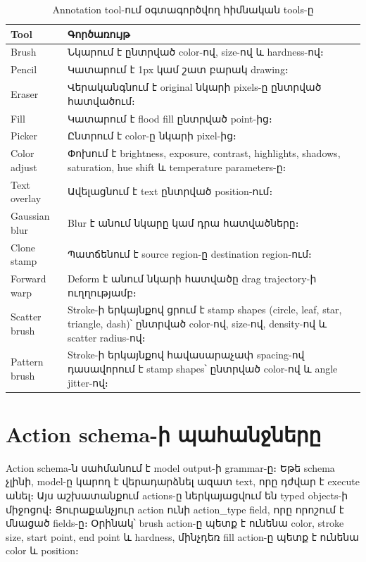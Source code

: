 \documentclass[12pt,a4paper]{report}
\newcommand{\Eng}[1]{\textenglish{#1}}
\begin{document}
\begin{table}[H]
\caption{Annotation tool-ում օգտագործվող հիմնական tools-ը}
\centering
\begin{tabularx}{\textwidth}{p{3.5cm}X}
\toprule
\textbf{Tool} & \textbf{Գործառույթ} \\
\midrule
\Eng{Brush} & Նկարում է ընտրված color-ով, size-ով և hardness-ով։ \\
\Eng{Pencil} & Կատարում է 1px կամ շատ բարակ drawing։ \\
\Eng{Eraser} & Վերականգնում է original նկարի pixels-ը ընտրված հատվածում։ \\
\Eng{Fill} & Կատարում է flood fill ընտրված point-ից։ \\
\Eng{Picker} & Ընտրում է color-ը նկարի pixel-ից։ \\
\Eng{Color adjust} & Փոխում է brightness, exposure, contrast, highlights, shadows, saturation, hue shift և temperature parameters-ը։ \\
\Eng{Text overlay} & Ավելացնում է text ընտրված position-ում։ \\
\Eng{Gaussian blur} & Blur է անում նկարը կամ դրա հատվածները։ \\
\Eng{Clone stamp} & Պատճենում է source region-ը destination region-ում։ \\
\Eng{Forward warp} & Deform է անում նկարի հատվածը drag trajectory-ի ուղղությամբ։ \\
\Eng{Scatter brush} & Stroke-ի երկայնքով ցրում է stamp shapes (circle, leaf, star, triangle, dash)՝ ընտրված color-ով, size-ով, density-ով և scatter radius-ով։ \\
\Eng{Pattern brush} & Stroke-ի երկայնքով հավասարաչափ spacing-ով դասավորում է stamp shapes՝ ընտրված color-ով և angle jitter-ով։ \\
\bottomrule
\end{tabularx}
\end{table}

\section{Action schema-ի պահանջները}

Action schema-ն սահմանում է model output-ի grammar-ը։ Եթե schema չլինի, model-ը կարող է վերադարձնել ազատ text, որը դժվար է execute անել։ Այս աշխատանքում actions-ը ներկայացվում են typed objects-ի միջոցով։ Յուրաքանչյուր action ունի \Eng{action\_type} field, որը որոշում է մնացած fields-ը։ Օրինակ՝ brush action-ը պետք է ունենա color, stroke size, start point, end point և hardness, մինչդեռ fill action-ը պետք է ունենա color և position։
\end{document}
